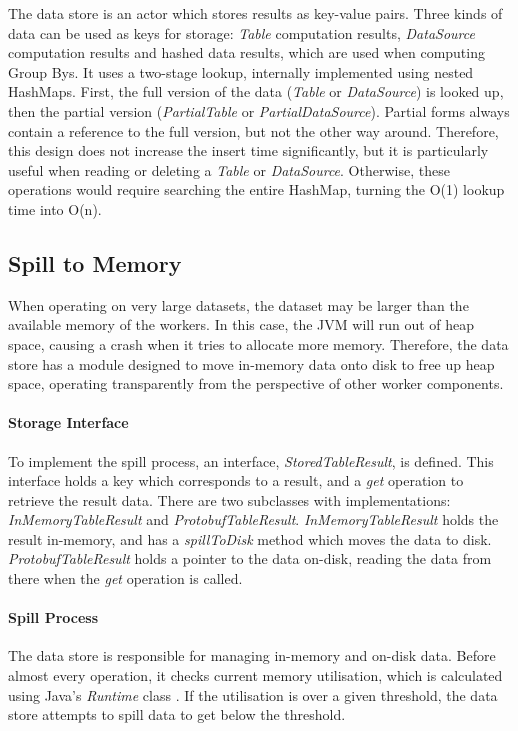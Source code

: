 The data store is an actor which stores results as key-value pairs. Three kinds of data can be used as keys for storage: \textit{Table} computation results, \textit{DataSource} computation results and hashed data results, which are used when computing Group Bys. It uses a two-stage lookup, internally implemented using nested HashMaps. First, the full version of the data (\textit{Table} or \textit{DataSource}) is looked up, then the partial version (\textit{PartialTable} or \textit{PartialDataSource}). Partial forms always contain a reference to the full version, but not the other way around. Therefore, this design does not increase the insert time significantly, but it is particularly useful when reading or deleting a \textit{Table} or \textit{DataSource}. Otherwise, these operations would require searching the entire HashMap, turning the O(1) lookup time into O(n).

\subsection{Spill to Memory}
When operating on very large datasets, the dataset may be larger than the available memory of the workers. In this case, the JVM will run out of heap space, causing a crash when it tries to allocate more memory. Therefore, the data store has a module designed to move in-memory data onto disk to free up heap space, operating transparently from the perspective of other worker components. 

\paragraph{Storage Interface}
To implement the spill process, an interface, \textit{StoredTableResult}, is defined. This interface holds a key which corresponds to a result, and a \textit{get} operation to retrieve the result data. There are two subclasses with implementations: \textit{InMemoryTableResult} and \textit{ProtobufTableResult}. \textit{InMemoryTableResult} holds the result in-memory, and has a \textit{spillToDisk} method which moves the data to disk. \textit{ProtobufTableResult} holds a pointer to the data on-disk, reading the data from there when the \textit{get} operation is called.

\paragraph{Spill Process}
The data store is responsible for managing in-memory and on-disk data. Before almost every operation, it checks current memory utilisation, which is calculated using Java's \textit{Runtime} class \cite{javaruntimeclass}. If the utilisation is over a given threshold, the data store attempts to spill data to get below the threshold.

